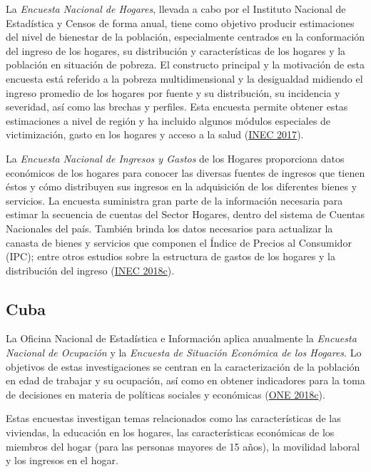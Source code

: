 \documentclass[
  12pt,
  spanish,
]{book}
\begin{document}
La \emph{Encuesta Nacional de Hogares}, llevada a cabo por el Instituto Nacional de Estadística y Censos de forma anual, tiene como objetivo producir estimaciones del nivel de bienestar de la población, especialmente centrados en la conformación del ingreso de los hogares, su distribución y características de los hogares y la población en situación de pobreza. El constructo principal y la motivación de esta encuesta está referido a la pobreza multidimensional y la desigualdad midiendo el ingreso promedio de los hogares por fuente y su distribución, su incidencia y severidad, así como las brechas y perfiles. Esta encuesta permite obtener estas estimaciones a nivel de región y ha incluido algunos módulos especiales de victimización, gasto en los hogares y acceso a la salud (\protect\hyperlink{ref-INEC-CR_2017}{INEC 2017}).

La \emph{Encuesta Nacional de Ingresos y Gastos} de los Hogares proporciona datos económicos de los hogares para conocer las diversas fuentes de ingresos que tienen éstos y cómo distribuyen sus ingresos en la adquisición de los diferentes bienes y servicios. La encuesta suministra gran parte de la información necesaria para estimar la secuencia de cuentas del Sector Hogares, dentro del sistema de Cuentas Nacionales del país. También brinda los datos necesarios para actualizar la canasta de bienes y servicios que componen el Índice de Precios al Consumidor (IPC); entre otros estudios sobre la estructura de gastos de los hogares y la distribución del ingreso (\protect\hyperlink{ref-INEC-CR_2018}{INEC 2018c}).

\hypertarget{cuba}{%
\subsection*{Cuba}\label{cuba}}

La Oficina Nacional de Estadística e Información aplica anualmente la \emph{Encuesta Nacional de Ocupación} y la \emph{Encuesta de Situación Económica de los Hogares}. Lo objetivos de estas investigaciones se centran en la caracterización de la población en edad de trabajar y su ocupación, así como en obtener indicadores para la toma de decisiones en materia de políticas sociales y económicas (\protect\hyperlink{ref-ONE-CU}{ONE 2018c}).

Estas encuestas investigan temas relacionados como las características de las viviendas, la educación en los hogares, las características económicas de los miembros del hogar (para las personas mayores de 15 años), la movilidad laboral y los ingresos en el hogar.
\end{document}
